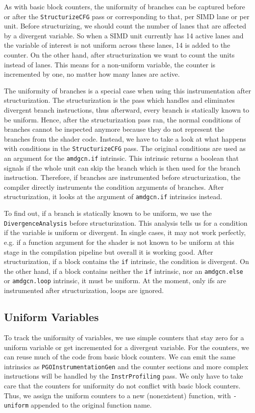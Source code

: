 As with basic block counters, the uniformity of branches can be captured before or after the \texttt{StructurizeCFG} pass or corresponding to that, per SIMD lane or per unit.
Before structurizing, we should count the number of lanes that are affected by a divergent variable.
So when a SIMD unit currently has 14 active lanes and the variable of interest is not uniform across these lanes, 14 is added to the counter.
On the other hand, after structurization we want to count the units instead of lanes.
This means for a non-uniform variable, the counter is incremented by one, no matter how many lanes are active.

The uniformity of branches is a special case when using this instrumentation after structurization.
The structurization is the pass which handles and eliminates divergent branch instructions, thus afterward, every branch is statically known to be uniform.
Hence, after the structurization pass ran, the normal conditions of branches cannot be inspected anymore because they do not represent the branches from the shader code.
Instead, we have to take a look at what happens with conditions in the \texttt{StructurizeCFG} pass.
The original conditions are used as an argument for the \texttt{amdgcn.if} intrinsic.
This intrinsic returns a boolean that signals if the whole unit can skip the branch which is then used for the branch instruction.
Therefore, if branches are instrumented before structurization, the compiler directly instruments the condition arguments of branches.
After structurization, it looks at the argument of \texttt{amdgcn.if} intrinsics instead.

To find out, if a branch is statically known to be uniform, we use the \texttt{DivergenceAnalysis} before structurization.
This analysis tells us for a condition if the variable is uniform or divergent.
In single cases, it may not work perfectly, e.g. if a function argument for the shader is not known to be uniform at this stage in the compilation pipeline but overall it is working good.
After structurization, if a block contains the \texttt{if} intrinsic, the condition is divergent.
On the other hand, if a block contains neither the \texttt{if} intrinsic, nor an \texttt{amdgcn.else} or \texttt{amdgcn.loop} intrinsic, it must be uniform.
At the moment, only ifs are instrumented after structurization, loops are ignored.

\subsection{Uniform Variables}
\label{sub:impl_uniform_vars}
To track the uniformity of variables, we use simple counters that stay zero for a uniform variable or get incremented for a divergent variable.
For the counters, we can reuse much of the code from basic block counters.
We can emit the same intrinsics as \texttt{PGOInstrumentationGen} and the counter sections and more complex instructions will be handled by the \texttt{InstrProfiling} pass.
We only have to take care that the counters for uniformity do not conflict with basic block counters.
Thus, we assign the uniform counters to a new (nonexistent) function, with \texttt{-uniform} appended to the original function name.

